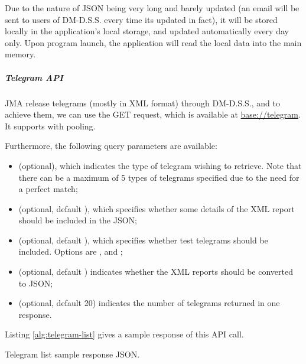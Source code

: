 Due to the nature of JSON being very long and barely updated (an email will be sent to users of DM-D.S.S. every time its updated in fact), it will be stored locally in the application's local storage, and updated automatically every day only. Upon program launch, the application will read the local data into the main memory.

\subparagraph{Telegram API}

JMA release telegrams (mostly in XML format) through DM-D.S.S., and to achieve them, we can use the  GET request, which is available at \url{base://telegram}. It supports  with pooling.

Furthermore, the following query parameters are available:
\begin{itemize}
    \item {} (optional), which indicates the type of telegram wishing to retrieve. Note that there can be a maximum of 5 types of telegrams specified due to the need for a perfect match;
    \item {} (optional, default ), which specifies whether some details of the XML report should be included in the JSON;
    \item {} (optional, default ), which specifies whether test telegrams should be included. Options are ,  and ;
    \item {} (optional, default ) indicates whether the XML reports should be converted to JSON;
    \item {} (optional, default 20) indicates the number of telegrams returned in one response.
\end{itemize}

Listing \ref{alg:telegram-list} gives a sample response of this API call.

\begin{listing}[!ht]
    \caption{Telegram list sample response JSON.}
    \label{alg:telegram-list}
\end{listing}

